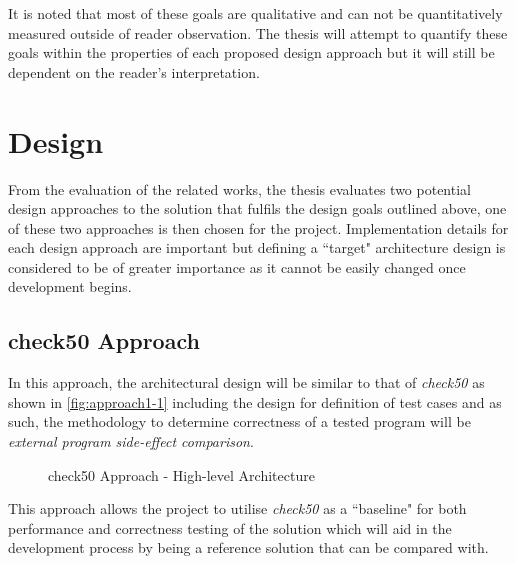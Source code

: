 \documentclass[hidelinks]{report}
\begin{document}
It is noted that most of these goals are qualitative and can not be quantitatively measured outside of reader observation. The thesis will attempt to quantify these goals within the properties of each proposed design approach but it will still be dependent on the reader's interpretation.

\section{Design}

From the evaluation of the related works, the thesis evaluates two potential design approaches to the solution that fulfils the design goals outlined above, one of these two approaches is then chosen for the project. Implementation details for each design approach are important but defining a ``target" architecture design is considered to be of greater importance as it cannot be easily changed once development begins.

\subsection{check50 Approach}

In this approach, the architectural design will be similar to that of \textit{check50} as shown in \autoref{fig:approach1-1} including the design for definition of test cases and as such, the methodology to determine correctness of a tested program will be \textit{external program side-effect comparison}.

\begin{figure}[h]
	\centering
	\caption{check50 Approach - High-level Architecture}
	\label{fig:approach1-1}
\end{figure}

This approach allows the project to utilise \textit{check50} as a ``baseline" for both performance and correctness testing of the solution which will aid in the development process by being a reference solution that can be compared with.
\end{document}
